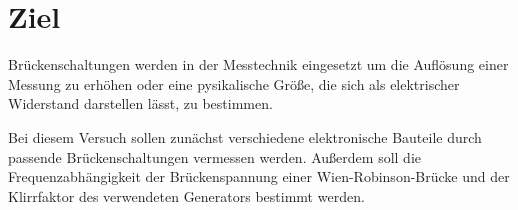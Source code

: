 \section{Ziel}
Brückenschaltungen werden in der Messtechnik 
eingesetzt um die Auflösung einer Messung zu erhöhen
oder eine pysikalische Größe,
die sich als elektrischer Widerstand darstellen lässt,
zu bestimmen. 


Bei diesem Versuch sollen zunächst verschiedene 
elektronische Bauteile durch passende
Brückenschaltungen vermessen werden.
Außerdem soll die Frequenzabhängigkeit der
Brückenspannung einer Wien-Robinson-Brücke und
der Klirrfaktor des verwendeten Generators bestimmt
werden.


